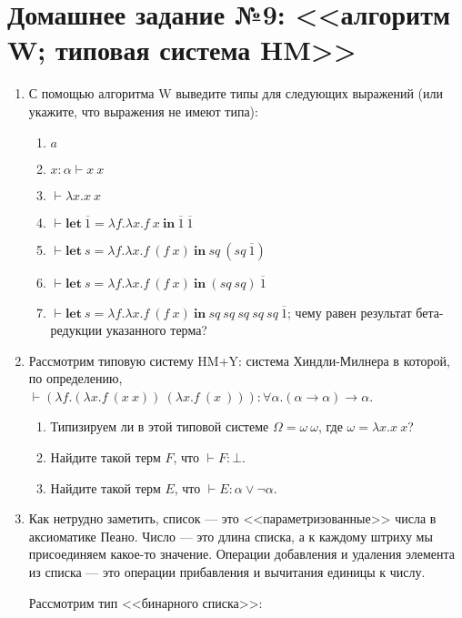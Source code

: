 \documentclass[10pt,a4paper,oneside]{article}
\begin{document}
\section*{Домашнее задание №9: <<алгоритм W; типовая система HM>>}
\begin{enumerate}
\item С помощью алгоритма W выведите типы для следующих выражений (или укажите, что выражения не имеют типа):
\begin{enumerate}
\item $a$
\item $x:\alpha\vdash x\ x$
\item $\vdash \lambda x.x\ x$
\item $\vdash \textbf{let}\ \overline{1} = \lambda f.\lambda x.f\ x\ \textbf{in}\ \overline{1}\ \overline{1}$
\item $\vdash \textbf{let}\ s = \lambda f.\lambda x.f\ (f\ x)\ \textbf{in}\ sq\ (sq\ \overline{1})$
\item $\vdash \textbf{let}\ s = \lambda f.\lambda x.f\ (f\ x)\ \textbf{in}\ (sq\ sq)\ \overline{1}$
\item $\vdash \textbf{let}\ s = \lambda f.\lambda x.f\ (f\ x)\ \textbf{in}\ sq\ sq\ sq\ sq\ sq\ \overline{1}$;
чему равен результат бета-редукции указанного терма?
\end{enumerate}
\item Рассмотрим типовую систему HM+Y: система Хиндли-Милнера в которой, по определению,
$\vdash (\lambda f.(\lambda x.f\ (x\ x))\ (\lambda x.f\ (x\ ))): \forall \alpha.(\alpha\rightarrow\alpha)\rightarrow\alpha$.
\begin{enumerate}
\item Типизируем ли в этой типовой системе $\Omega = \omega\ \omega$, где $\omega = \lambda x.x\ x$?
\item Найдите такой терм $F$, что $\vdash F:\bot$.
\item Найдите такой терм $E$, что $\vdash E:\alpha\vee\neg\alpha$.                          
\end{enumerate}
\item Как нетрудно заметить, список --- это <<параметризованные>> числа в аксиоматике Пеано.
Число --- это длина списка, а к каждому штриху мы присоединяем какое-то значение.
Операции добавления и удаления элемента из списка --- это операции прибавления и вычитания
единицы к числу.

Рассмотрим тип <<бинарного списка>>:


\end{enumerate}
\end{document}
